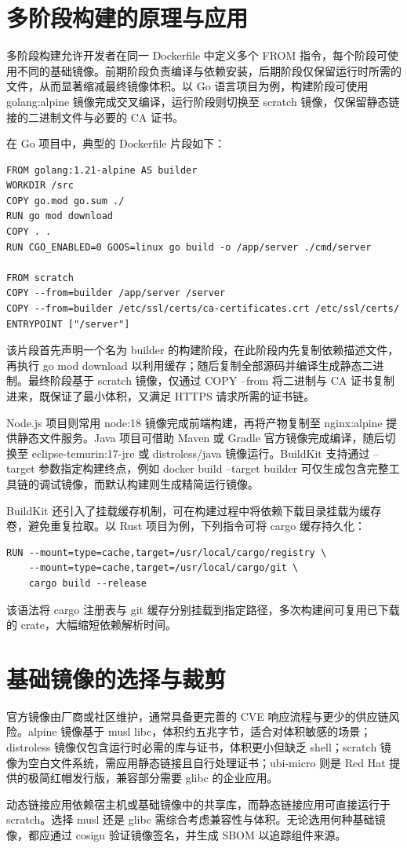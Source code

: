 \chapter{多阶段构建的原理与应用}
多阶段构建允许开发者在同一 Dockerfile 中定义多个 FROM 指令，每个阶段可使用不同的基础镜像。前期阶段负责编译与依赖安装，后期阶段仅保留运行时所需的文件，从而显著缩减最终镜像体积。以 Go 语言项目为例，构建阶段可使用 golang:alpine 镜像完成交叉编译，运行阶段则切换至 scratch 镜像，仅保留静态链接的二进制文件与必要的 CA 证书。\par
在 Go 项目中，典型的 Dockerfile 片段如下：\par
\begin{lstlisting}
FROM golang:1.21-alpine AS builder
WORKDIR /src
COPY go.mod go.sum ./
RUN go mod download
COPY . .
RUN CGO_ENABLED=0 GOOS=linux go build -o /app/server ./cmd/server

FROM scratch
COPY --from=builder /app/server /server
COPY --from=builder /etc/ssl/certs/ca-certificates.crt /etc/ssl/certs/
ENTRYPOINT ["/server"]
\end{lstlisting}
该片段首先声明一个名为 builder 的构建阶段，在此阶段内先复制依赖描述文件，再执行 go mod download 以利用缓存；随后复制全部源码并编译生成静态二进制。最终阶段基于 scratch 镜像，仅通过 COPY --from 将二进制与 CA 证书复制进来，既保证了最小体积，又满足 HTTPS 请求所需的证书链。\par
Node.js 项目则常用 node:18 镜像完成前端构建，再将产物复制至 nginx:alpine 提供静态文件服务。Java 项目可借助 Maven 或 Gradle 官方镜像完成编译，随后切换至 eclipse-temurin:17-jre 或 distroless/java 镜像运行。BuildKit 支持通过 --target 参数指定构建终点，例如 docker build --target builder 可仅生成包含完整工具链的调试镜像，而默认构建则生成精简运行镜像。\par
BuildKit 还引入了挂载缓存机制，可在构建过程中将依赖下载目录挂载为缓存卷，避免重复拉取。以 Rust 项目为例，下列指令可将 cargo 缓存持久化：\par
\begin{lstlisting}
RUN --mount=type=cache,target=/usr/local/cargo/registry \
    --mount=type=cache,target=/usr/local/cargo/git \
    cargo build --release
\end{lstlisting}
该语法将 cargo 注册表与 git 缓存分别挂载到指定路径，多次构建间可复用已下载的 crate，大幅缩短依赖解析时间。\par
\chapter{基础镜像的选择与裁剪}
官方镜像由厂商或社区维护，通常具备更完善的 CVE 响应流程与更少的供应链风险。alpine 镜像基于 musl libc，体积约五兆字节，适合对体积敏感的场景；distroless 镜像仅包含运行时必需的库与证书，体积更小但缺乏 shell；scratch 镜像为空白文件系统，需应用静态链接且自行处理证书；ubi-micro 则是 Red Hat 提供的极简红帽发行版，兼容部分需要 glibc 的企业应用。\par
动态链接应用依赖宿主机或基础镜像中的共享库，而静态链接应用可直接运行于 scratch。选择 musl 还是 glibc 需综合考虑兼容性与体积。无论选用何种基础镜像，都应通过 cosign 验证镜像签名，并生成 SBOM 以追踪组件来源。\par
